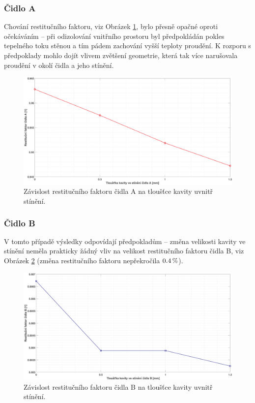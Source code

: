         \subsubsection{Čidlo A}
            Chování restitučního faktoru, viz Obrázek \ref{fig:kavita-A-graf}, bylo přesně opačné oproti očekáváním – při odizolování vnitřního prostoru byl předpokládán pokles tepelného toku stěnou a tím pádem zachování vyšší teploty proudění. K rozporu s předpoklady mohlo dojít vlivem zvětšení geometrie, která tak více narušovala proudění v okolí čidla a jeho stínění.
            \begin{figure}[ht!]
                \centering
                \includegraphics*[width=\textwidth]{400_SIMULACE_KONSTRUKCNICH_UPRAV/Grafy/kavita.eps}
                \caption{Závislost restitučního faktoru čidla A na tloušťce kavity uvnitř stínění.}
                \label{fig:kavita-A-graf}
            \end{figure}
        
        \newpage
        
        \subsubsection{Čidlo B}
            V tomto případě výsledky odpovídají předpokladům – změna velikosti kavity ve\,stínění neměla prakticky žádný vliv na velikost restitučního faktoru čidla B, viz Obrázek \ref{fig:kavita-B-graf} (změna restitučního faktoru nepřekročila $0.4 \, \%$).
        
            \begin{figure}[ht!]
                \centering
                \includegraphics*[width=\textwidth]{400_SIMULACE_KONSTRUKCNICH_UPRAV/Grafy/kavita_B.eps}
                \caption{Závislost restitučního faktoru čidla B na tloušťce kavity uvnitř stínění.}
                \label{fig:kavita-B-graf}
            \end{figure}
    